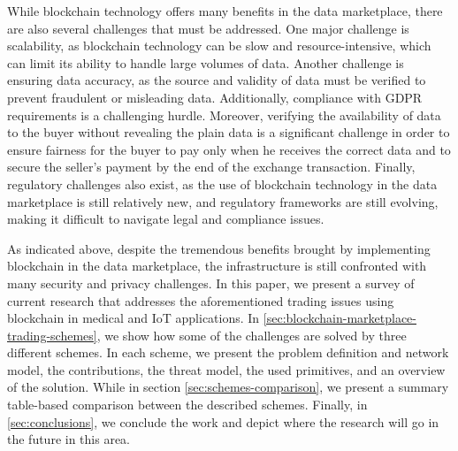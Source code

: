 While blockchain technology offers many benefits in the data marketplace, there are also several challenges that must be addressed. 
One major challenge is scalability, as blockchain technology can be slow and resource-intensive, which can limit its ability to handle large volumes of data.
Another challenge is ensuring data accuracy, as the source and validity of data must be verified to prevent fraudulent or misleading data.
Additionally, compliance with GDPR requirements is a challenging hurdle.
Moreover, verifying the availability of data to the buyer without revealing the plain data is a significant challenge in order to ensure fairness for the buyer to pay only when he receives the correct data and to secure the seller's payment by the end of the exchange transaction.
Finally, regulatory challenges also exist, as the use of blockchain technology in the data marketplace is still relatively new, and regulatory frameworks are still evolving, making it difficult to navigate legal and compliance issues.

As indicated above, despite the tremendous benefits brought by implementing blockchain in the data marketplace, the infrastructure is still confronted with many security and privacy challenges.
In this paper, we present a survey of current research that addresses the aforementioned trading issues using blockchain in medical and IoT applications.
In \cref{sec:blockchain-marketplace-trading-schemes}, we show how some of the challenges are solved by three different schemes.
In each scheme, we present the problem definition and network model, the contributions, the threat model, the used primitives, and an overview of the solution.
While in section \cref{sec:schemes-comparison}, we present a summary table-based comparison between the described schemes.
Finally, in \cref{sec:conclusions}, we conclude the work and depict where the research will go in the future in this area.
